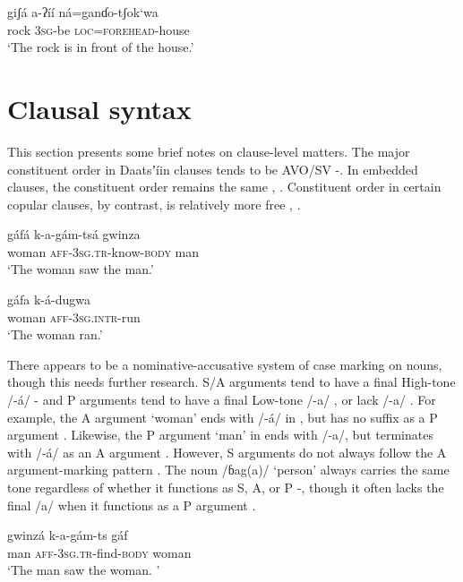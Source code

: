 \documentclass[output=paper]{langsci/langscibook}
\begin{document}
\ea\label{ex:ahlandc:65}
\gll
giʃá   a-ʔíí    ná=ganɗo-tʃok‘wa   \\ 
rock 3\textsc{sg}{}-be \textsc{loc}=\textsc{forehead}{}-house \\
\glt
‘The rock is in front of the house.’
\z

\section{Clausal syntax}\label{sec:ahlandc:11}

This section presents some brief notes on clause-level matters. The major constituent order in Daatsʼíin clauses tends to be AVO/SV -. In embedded clauses, the constituent order remains the same , . Constituent order in certain copular clauses, by contrast, is relatively more free , .

\ea\label{ex:ahlandc:66}
\gll
gáfá      k-a-gám-tsá    gwinza \\ 
woman \textsc{aff-3sg.tr}{}-know-\textsc{body}  man \\
\glt
‘The woman saw the man.’
\z

\ea\label{ex:ahlandc:67}
\gll
gáfa       k-á-dugwa \\
 woman \textsc{aff-3sg.intr}{}-run \\
\glt
‘The woman ran.’
\z

There appears to be a nominative-accusative system of case marking on nouns, though this needs further research. S/A arguments tend to have a final High-tone /-á/ - and P arguments tend to have a final Low-tone /-a/ ,  or lack /-a/ . For example, the A argument ‘woman’ ends with /-á/ in , but has no suffix as a P argument . Likewise, the P argument ‘man’ in  ends with /-a/, but terminates with /-á/ as an A argument . However, S arguments do not always follow the A argument-marking pattern . The noun /ɓag(a)/ ‘person’ always carries the same tone regardless of whether it functions as S, A, or P -, though it often lacks the final /a/ when it functions as a P argument . 

\ea\label{ex:ahlandc:68}
\gll
gwinzá  k-a-gám-ts   gáf  \\
man  \textsc{aff-3sg.tr}{}-find-\textsc{body}  woman \\
\glt
‘The man saw the woman. ’
\z
\end{document}
